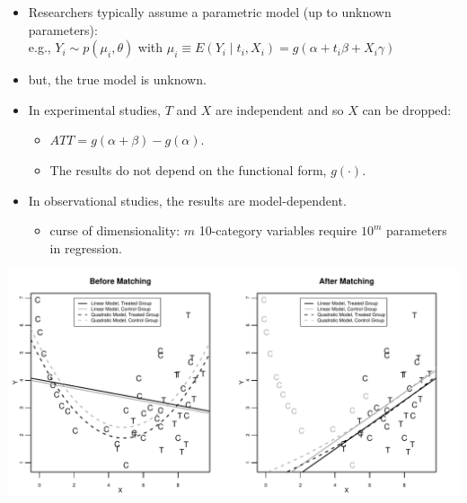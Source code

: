 \documentclass[20pt,landscape,pdftex]{foils}
\begin{document}
\begin{itemize}
\zerolistvertdimens 
\item Researchers typically assume a parametric model (up to unknown
  parameters):\\ e.g., $Y_i \sim p(\mu_i, \theta)$ with $\mu_i \equiv
  E(Y_i \mid t_i, X_i)=g(\alpha+t_i \beta + X_i \gamma)$\pause
\item but, the true model is unknown.\pause
\item In experimental studies, $T$ and $X$ are independent and so $X$
  can be dropped:\pause 
  \begin{itemize}
  \item $ATT = g(\alpha+\beta) - g(\alpha).$\pause
  \item The results do not depend on the functional form,
    $g(\cdot)$.\pause 
  \end{itemize}
\item In observational studies, the results are model-dependent.\pause
  \begin{itemize}
  \item curse of dimensionality: $m$ 10-category variables require
    $10^m$ parameters in regression.\pause
  \end{itemize}
\end{itemize}

 \begin{center}
   \includegraphics{figs/olspanel-thick.pdf}\pause
 \end{center}



\hypersetup{pdfpagetransition=Replace}
\end{document}
